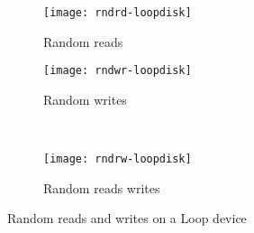 \begin{figure}[!ht]
  \begin{subfigure}[b]{0.2\textwidth}
  \texttt{[image: rndrd-loopdisk]}
  \caption{Random reads}
  \label{subfig:rndrd-loopdisk}
  \end{subfigure}
  \hspace{50mm}
  \begin{subfigure}[b]{0.2\textwidth}
  \texttt{[image: rndwr-loopdisk]}
  \caption{Random writes}
  \label{subfig:rndwr-loopdisk}
  \end{subfigure}\\
  \begin{subfigure}[b]{0.3\textwidth}
  \texttt{[image: rndrw-loopdisk]}
  \caption{Random reads writes}
  \label{subfig:rndrw-loopdisk}
  \end{subfigure}
\caption{Random reads and writes on a Loop device}\label{fig:rndloopdisk}
\end{figure}


